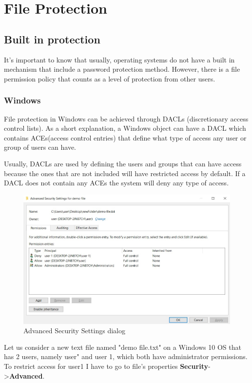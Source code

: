 \chapter{File Protection}
	\section{Built in protection}
	It's important to know that usually, operating systems do not have a built in mechanism that include a password protection method. However, there is a file permission policy that counts as a level of protection from other users.
	
	\subsection{Windows}
	File protection in Windows can be achieved through DACLs (discretionary access control lists). As a short explanation, a Windows object can have a DACL which contains ACEs(access control entries) that define what type of access any user or group of users can have. \cite{MDSNDACsLACEs}
		
	Usually, DACLs are used by defining the users and groups that can have access because the ones that are not included will have restricted access by default. If a DACL does not contain any ACEs the system will deny any type of access.
	
	\begin{figure}[h!]
		\includegraphics[width=\linewidth]{images/securitySettings.jpg}
		\caption{Advanced Security Settings dialog}
		\label{fig:securitySettings}
	\end{figure}
	
	Let us consider a new text file named "demo file.txt" on a Windows 10 OS that has 2 users, namely user" and user 1, which both have administrator permissions. To restrict access for user1 I have to go to file's properties \textbf{Security}-\textgreater\textbf{Advanced}.

